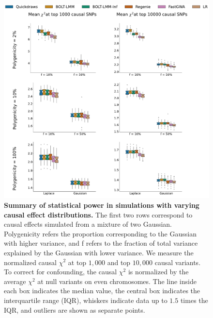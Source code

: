 \begin{figure}[h!]
    \centering
    \includegraphics[width=\textwidth]{figures/sim_power/mog_power.pdf}
    \caption{
    \textbf{
    Summary of statistical power in simulations with varying causal effect distributions.}
    The first two rows correspond to causal effects simulated from a mixture of two Gaussian. 
    Polygenicity refers the proportion corresponding to the Gaussian with higher variance, and f refers to the fraction of total variance explained by the Gaussian with lower variance.
    We measure the normalized causal $\chi^2$ at top $1{,}000$ and top $10{,}000$ causal variants.
    To correct for confounding, the causal $\chi^2$ is normalized by the average $\chi^2$ at null variants on even chromosomes.
    The line inside each box indicates the median value, the central box indicates the interquartile range (IQR), whiskers indicate data up to $1.5$ times the IQR, and outliers are shown as separate points.
    }
    \label{fig:sim_power_mog}
\end{figure}


